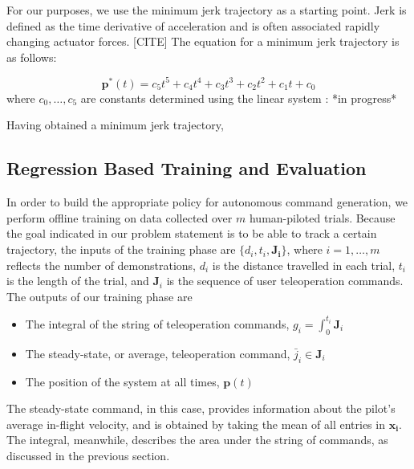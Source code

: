 \documentclass[letterpaper, 10 pt, conference]{ieeeconf}  %
\newcommand\NB[1]{$\spadesuit$\footnote{NB: #1}}
\DeclareMathOperator*{\argmin}{arg\,min}
\begin{document}
For our purposes, we use the minimum jerk trajectory as a starting point. Jerk is defined as the time derivative of acceleration and is often associated rapidly changing actuator forces. [CITE] The equation for a minimum jerk trajectory is as follows:

\begin{equation}
    \mathbf{p}^*(t) = c_5t^5 + c_4t^4 + c_3t^3 + c_2t^2 + c_1t + c_0 
\end{equation}
where $c_0,\ldots,c_5$ are constants determined using the linear system : *in progress*

Having obtained a minimum jerk trajectory, 

\subsection{Regression Based Training and Evaluation} \label{sec:train}
In order to build the appropriate policy for autonomous command generation, we perform offline training on data collected over $m$ human-piloted trials. Because the goal indicated in our problem statement is to be able to track a certain trajectory, the inputs of the training phase are $\{d_i,t_i,\mathbf{J_i}\}$, where $i=1,\ldots,m$ reflects the number of demonstrations, %
$d_i$ is the distance travelled in each trial, $t_i$ is the length of the trial, and $\mathbf{J}_i$ is the sequence of user teleoperation commands. The outputs of our training phase are \begin{itemize}
    \item The integral of the string of teleoperation commands, $g_i = \int_0^{t_i}\mathbf{J}_i$
    \item The steady-state, or average, teleoperation command, $\bar{j}_i \in \mathbf{J}_i$
    \item The position of the system at all times, $\mathbf{p}(t)$
\end{itemize}
The steady-state command, in this case, provides information about the pilot's average in-flight velocity, and is obtained by taking the mean of all entries in $\mathbf{x_i}$. The integral, meanwhile, describes the area under the string of commands, as discussed in the previous section. %
\end{document}
